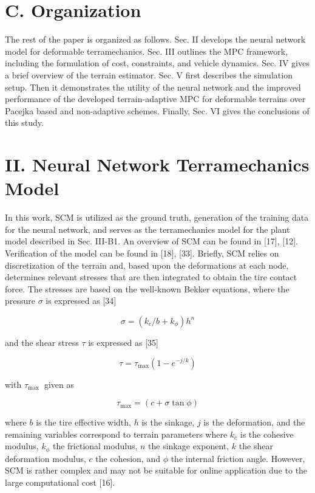 \documentclass[10pt]{article}
\begin{document}
\section*{C. Organization}
The rest of the paper is organized as follows. Sec. II develops the neural network model for deformable terramechanics. Sec. III outlines the MPC framework, including the formulation of cost, constraints, and vehicle dynamics. Sec. IV gives a brief overview of the terrain estimator. Sec. V first describes the simulation setup. Then it demonstrates the utility of the neural network and the improved performance of the developed terrain-adaptive MPC for deformable terrains over Pacejka based and non-adaptive schemes. Finally, Sec. VI gives the conclusions of this study.

\section*{II. Neural Network Terramechanics Model}
In this work, SCM is utilized as the ground truth, generation of the training data for the neural network, and serves as the terramechanics model for the plant model described in Sec. III-B1. An overview of SCM can be found in [17], [12]. Verification of the model can be found in [18], [33]. Briefly, SCM relies on discretization of the terrain and, based upon the deformations at each node, determines relevant stresses that are then integrated to obtain the tire contact force. The stresses are based on the well-known Bekker equations, where the pressure $\sigma$ is expressed as [34]


\begin{equation*}
\sigma=\left(k_{c} / b+k_{\phi}\right) h^{n} \tag{1}
\end{equation*}


and the shear stress $\tau$ is expressed as [35]


\begin{equation*}
\tau=\tau_{\max }\left(1-e^{-j / k}\right) \tag{2}
\end{equation*}


with $\tau_{\text {max }}$ given as


\begin{equation*}
\tau_{\max }=(c+\sigma \tan \phi) \tag{3}
\end{equation*}


where $b$ is the tire effective width, $h$ is the sinkage, $j$ is the deformation, and the remaining variables correspond to terrain parameters where $k_{c}$ is the cohesive modulus, $k_{\phi}$ the frictional modulus, $n$ the sinkage exponent, $k$ the shear deformation modulus, $c$ the cohesion, and $\phi$ the internal friction angle. However, SCM is rather complex and may not be suitable for online application due to the large computational cost [16].
\end{document}
